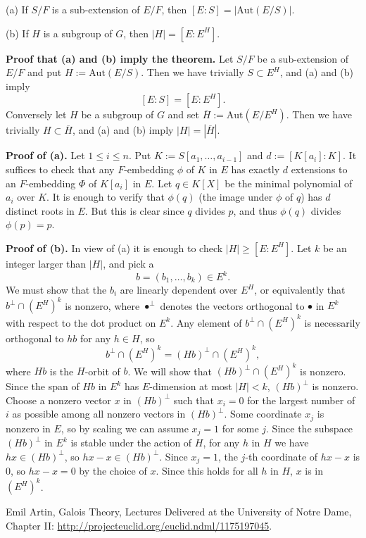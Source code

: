 \documentclass[12pt]{article}
\newcommand{\nn}{\noindent}
\newcommand{\so}{\bigskip}
\begin{document}
(a) If $S/F$ is a sub-extension of $E/F$, then $[E:S]=|\text{Aut}(E/S)|$.  

(b) If $H$ is a subgroup of $G$, then $|H|=[E:E^H]$.  

\nn\textbf{Proof that (a) and (b) imply the theorem.} Let $S/F$ be a sub-extension of $E/F$ and put $H:=\text{Aut}(E/S)$. Then we have trivially $S\subset E^H$, and (a) and (b) imply 
$$
[E:S]=[E:E^H].
$$
Conversely let $H$ be a subgroup of $G$ and set $\overline H:=\text{Aut}(E/E^H)$. Then we have trivially $H\subset\overline H$, and (a) and (b) imply $|H|=|\overline H|$.

\nn\textbf{Proof of (a).} Let $1\le i\le n$. Put $K:=S[a_1,\dots,a_{i-1}]$ and $d:=[K[a_i]:K]$. It suffices to check that any $F$-embedding $\phi$ of $K$ in $E$ has exactly $d$ extensions to an $F$-embedding $\Phi$ of $K[a_i]$ in $E$. Let $q\in K[X]$ be the minimal polynomial of $a_i$ over $K$. It is enough to verify that $\phi(q)$ (the image under $\phi$ of $q$) has $d$ distinct roots in $E$. But this is clear since $q$ divides $p$, and thus $\phi(q)$ divides $\phi(p)=p$.

\nn\textbf{Proof of (b).} In view of (a) it is enough to check $|H|\ge[E:E^H]$. Let $k$ be an integer larger than $|H|$, and pick a 
$$
b=(b_1,\dots,b_k)\in E^k.
$$
We must show that the $b_i$ are linearly dependent over $E^H$, or equivalently that $b^\perp\cap(E^H)^k$ is nonzero, where $\bullet^\perp$ denotes the vectors orthogonal to $\bullet$ in $E^k$ with respect to the dot product on $E^k$. Any element of $b^\perp\cap (E^H)^k$ is necessarily orthogonal to $hb$ for any $h\in H$, so 
$$
b^\perp\cap(E^H)^k=(Hb)^\perp\cap(E^H)^k,
$$ 
where $Hb$ is the $H$-orbit of $b$. We will show that $(Hb)^\perp\cap(E^H)^k$ is nonzero. Since the span of $Hb$ in $E^k$ has $E$-dimension at most $|H|<k$, $(Hb)^\perp$ is nonzero. Choose a nonzero vector $x$ in $(Hb)^\perp$ such that $x_i=0$ for the largest number of $i$ as possible among all nonzero vectors in $(Hb)^\perp$. Some coordinate $x_j$ is nonzero in $E$, so by scaling we can assume $x_j=1$ for some $j$. Since the subspace $(Hb)^\perp$ in $E^k$ is stable under the action of $H$, for any $h$ in $H$ we have $hx \in(Hb)^\perp$, so $hx-x\in(Hb)^\perp$. Since $x_j=1$, the $j$-th coordinate of $hx-x$ is $0$, so $hx-x=0$ by the choice of $x$. Since this holds for all $h$ in $H$, $x$ is in $(E^H)^k$.\so

\nn[A] Emil Artin, Galois Theory, Lectures Delivered at the University of Notre Dame, Chapter II: \href{http://projecteuclid.org/euclid.ndml/1175197045}{http://projecteuclid.org/euclid.ndml/1175197045}. 
\end{document}
